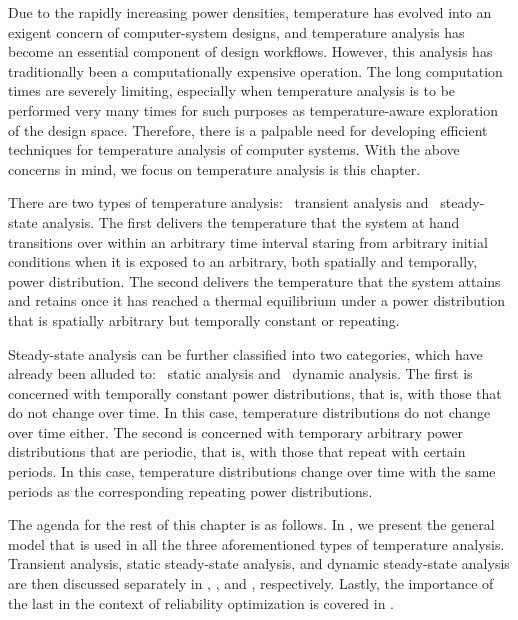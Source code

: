 Due to the rapidly increasing power densities, temperature has evolved into an
exigent concern of computer-system designs, and temperature analysis has become
an essential component of design workflows. However, this analysis has
traditionally been a computationally expensive operation. The long computation
times are severely limiting, especially when temperature analysis is to be
performed very many times for such purposes as temperature-aware exploration of
the design space. Therefore, there is a palpable need for developing efficient
techniques for temperature analysis of computer systems. With the above concerns
in mind, we focus on temperature analysis is this chapter.

There are two types of temperature analysis: \one~transient analysis and
\two~steady-state analysis. The first delivers the temperature that the system
at hand transitions over within an arbitrary time interval staring from
arbitrary initial conditions when it is exposed to an arbitrary, both spatially
and temporally, power distribution. The second delivers the temperature that the
system attains and retains once it has reached a thermal equilibrium under a
power distribution that is spatially arbitrary but temporally constant or
repeating.

Steady-state analysis can be further classified into two categories, which have
already been alluded to: \one~static analysis and \two~dynamic analysis. The
first is concerned with temporally constant power distributions, that is, with
those that do not change over time. In this case, temperature distributions do
not change over time either. The second is concerned with temporary arbitrary
power distributions that are periodic, that is, with those that repeat with
certain periods. In this case, temperature distributions change over time with
the same periods as the corresponding repeating power distributions.

The agenda for the rest of this chapter is as follows. In
, we present the general model that is used in all the
three aforementioned types of temperature analysis. Transient analysis, static
steady-state analysis, and dynamic steady-state analysis are then discussed
separately in , ,
and , respectively. Lastly, the importance
of the last in the context of reliability optimization is covered in
.
